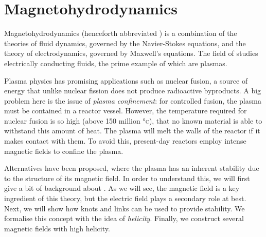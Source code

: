 
\chapter{Magnetohydrodynamics}
\label{chap:magnetohydrodynamics}
Magnetohydrodynamics (henceforth abbreviated \mhd\!\!)
is a combination of the theories of fluid dynamics,
governed by the Navier-Stokes equations,
and the theory of electrodynamics,
governed by Maxwell’s equations.
The field of \mhd studies electrically conducting fluids,
the prime example of which are plasmas.

Plasma physics has promising applications such as nuclear fusion,
a source of energy that unlike nuclear fission does not produce radioactive byproducts.
A big problem here is the issue of \emph{plasma confinement}:
for controlled fusion, the plasma must be contained in a reactor vessel.
However, the temperature required for nuclear fusion is so high (above 150 million \textsc{°c}),
that no known material is able to withstand this amount of heat.
The plasma will melt the walls of the reactor if it makes contact with them.
To avoid this, present-day reactors employ intense magnetic fields to confine the plasma.

Alternatives have been proposed,
where the plasma has an inherent stability due to the structure of its magnetic field.
In order to understand this,
we will first give a bit of background about \mhd.
As we will see, the magnetic field is a key ingredient of this theory,
but the electric field plays a secondary role at best.
Next, we will show how knots and links can be used to provide stability.
We formalise this concept with the idea of \emph{helicity}.
Finally, we construct several magnetic fields with high helicity.

